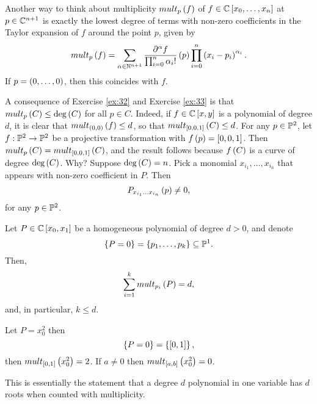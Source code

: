\begin{note*}
Another way to think about multiplicity $ mult_p\rb{f} $ of $ f \in \C\sb{x_0, \dots, x_n} $ at $ p \in \C^{n + 1} $ is exactly the lowest degree of terms with non-zero coefficients in the Taylor expansion of $ f $ around the point $ p $, given by
$$ mult_p\rb{f} = \sum_{\alpha \in \N^{n + 1}} \dfrac{\partial^\alpha f}{\prod_{i = 0}^n \alpha_i!}\rb{p}\prod_{i = 0}^n \rb{x_i - p_i}^{\alpha_i}. $$
If $ p = \rb{0, \dots, 0} $, then this coincides with $ f $.
\end{note*}

\begin{remark}
\label{rem:11.4}
A consequence of Exercise \ref{ex:32} and Exercise \ref{ex:33} is that $ mult_p\rb{C} \le \deg\rb{C} $ for all $ p \in C $. Indeed, if $ f \in \C\sb{x, y} $ is a polynomial of degree $ d $, it is clear that $ mult_{\rb{0, 0}}\rb{f} \le d $, so that $ mult_{\sb{0, 0, 1}}\rb{C} \le d $. For any $ p \in \P^2 $, let $ f : \P^2 \to \P^2 $ be a projective transformation with $ f\rb{p} = \sb{0, 0, 1} $. Then $ mult_p\rb{C} = mult_{\sb{0, 0, 1}}\rb{C} $, and the result follows because $ f\rb{C} $ is a curve of degree $ \deg\rb{C} $. Why? Suppose $ \deg\rb{C} = n $. Pick a monomial $ x_{i_1}, \dots, x_{i_n} $ that appears with non-zero coefficient in $ P $. Then
$$ P_{x_{i_1} \dots x_{i_n}}\rb{p} \ne 0, $$
for any $ p \in \P^2 $.
\end{remark}

\begin{lemma}
\label{lem:11.5}
Let $ P \in \C\sb{x_0, x_1} $ be a homogeneous polynomial of degree $ d > 0 $, and denote
$$ \cb{P = 0} = \cb{p_1, \dots, p_k} \subseteq \P^1. $$
Then,
$$ \sum_{i = 1}^k mult_{p_i}\rb{P} = d, $$
and, in particular, $ k \le d $.
\end{lemma}

\begin{example*}
Let $ P = x_0^2 $ then
$$ \cb{P = 0} = \cb{\sb{0, 1}}, $$
then $ mult_{\sb{0, 1}}\rb{x_0^2} = 2 $. If $ a \ne 0 $ then $ mult_{\sb{a, b}}\rb{x_0^2} = 0 $.
\end{example*}

This is essentially the statement that a degree $ d $ polynomial in one variable has $ d $ roots when counted with multiplicity.

